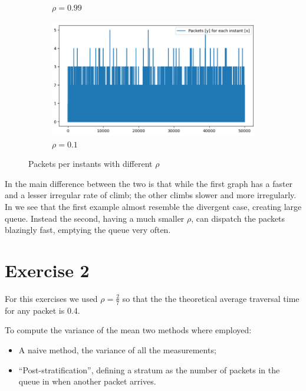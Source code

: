 \documentclass[10pt,a4paper]{article}
\begin{document}
\begin{figure}[h]
\begin{subfigure}[t]{.45\textwidth}
    \caption{\(\rho = 0.99\)}
	\label{fig:rho099}
  \end{subfigure}
  \hfill
  \begin{subfigure}[t]{.45\textwidth}
    \centering
	\includegraphics[width=\linewidth]{img/rho0.1}
    \caption{\(\rho = 0.1\)}
	\label{fig:rho010}
  \end{subfigure}
  \caption{Packets per instants with different \(\rho\)}
\end{figure}
  

In  the main difference between the two is that while the first graph has a faster and a lesser irregular rate of climb; the other climbs slower and more irregularly. In   we see that the first example almost resemble the divergent case, creating large queue. Instead the second, having a much smaller \(\rho\), can dispatch the packets blazingly fast, emptying the queue very often.

\section*{Exercise 2}

For this exercises we used \(\rho = \frac{2}{7}\) so that the the theoretical average traversal time for any packet is 0.4.

To compute the variance of the mean two methods where employed:
\begin{itemize}
\item A naive method, the variance of all the measurements;
\item ``Post-stratification'', defining a stratum as the number of packets in the queue in when another packet arrives.
\end{itemize}
\end{document}
